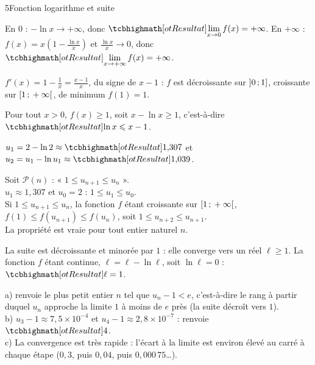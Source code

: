 \begin{corrigeBac}{5}{Fonction logarithme et suite}
\begin{questions}
  \item En $0$ : $-\ln x\to+\infty$, donc $\res{\lim\limits_{x\to0}f(x)=+\infty}$. En $+\infty$ : $f(x)=x\left(1-\frac{\ln x}{x}\right)$ et
    $\frac{\ln x}{x}\to0$, donc $\res{\lim\limits_{x\to+\infty}f(x)=+\infty}$. 
  \item $f'(x)=1-\frac1x=\frac{x-1}{x}$, du signe de $x-1$ : $f$ est décroissante sur $\mathopen{]}0\,{;}\,1\mathclose{]}$, croissante sur $\mathopen{[}1\,{;}\,+\infty\mathclose{[}$, de
    minimum $f(1)=1$.
\begin{center}
\begin{tableau}
\end{tableau}
\end{center}
  \item Pour tout $x>0$, $f(x)\geq1$, soit $x-\ln x\geq1$, c'est-à-dire $\res{\ln x\leq x-1}$. 
\end{questions}
\begin{questions}[resume]
  \item $u_1=2-\ln2\approx\res{1{,}307}$ et $u_2=u_1-\ln u_1\approx\res{1{,}039}$. 
  \item Soit $\mathcal{P}(n)$ : « $1\leq u_{n+1}\leq u_n$ ».\\
     $u_1\approx1{,}307$ et $u_0=2$ : $1\leq u_1\leq u_0$.\\
     Si $1\leq u_{n+1}\leq u_n$, la fonction $f$ étant croissante sur $\mathopen{[}1\,{;}\,+\infty\mathclose{[}$,
    $f(1)\leq f(u_{n+1})\leq f(u_n)$, soit $1\leq u_{n+2}\leq u_{n+1}$.\\
     La propriété est vraie pour tout entier naturel $n$. \pts{1 pt}
  \item La suite est décroissante et minorée par $1$ : elle converge vers un réel $\ell\geq1$. La fonction $f$ étant continue,
    $\ell=\ell-\ln\ell$, soit $\ln\ell=0$ : $\res{\ell=1}$. 
  \item a)  renvoie le plus petit entier $n$ tel que $u_n-1<e$, c'est-à-dire le rang à partir duquel $u_n$ approche la
    limite $1$ à moins de $e$ près (la suite décroît vers $1$).\\
    b) $u_3-1\approx7{,}5\times10^{-4}$ et $u_4-1\approx2{,}8\times10^{-7}$ :  renvoie $\res{4}$.\\
    c) La convergence est très rapide : l'écart à la limite est environ élevé au carré à chaque étape ($0{,}3$, puis $0{,}04$, puis
    $0{,}000\,75$…). 
\end{questions}
\end{corrigeBac}

